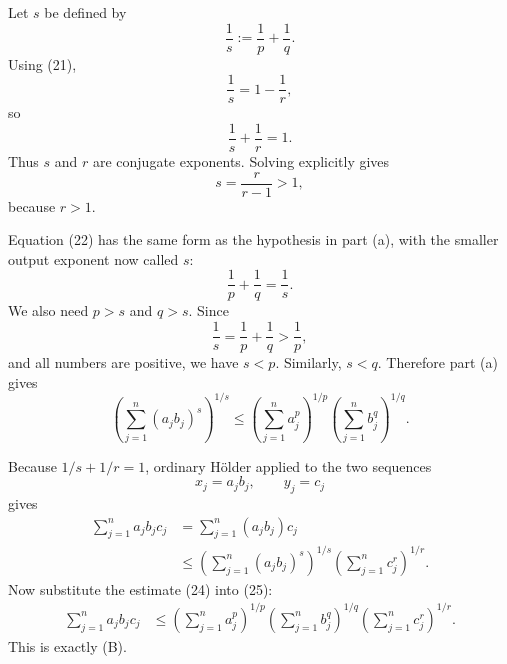 \documentclass[11pt]{article}
\newcommand{\norm}[1]{\left\lVert #1\right\rVert}
\begin{document}
\begin{solutionBox}
Let \(s\) be defined by
\[
  \frac1s:=\frac1p+\frac1q.
  \tag{22}
\]
Using (21),
\[
  \frac1s=1-\frac1r,
\]
so
\[
  \frac1s+\frac1r=1.
  \tag{23}
\]
Thus \(s\) and \(r\) are conjugate exponents. Solving explicitly gives
\[
  s=\frac{r}{r-1}>1,
\]
because \(r>1\).
\end{solutionBox}

\begin{solutionBox}
Equation (22) has the same form as the hypothesis in part (a), with the smaller output exponent now called \(s\):
\[
  \frac1p+\frac1q=\frac1s.
\]
We also need \(p>s\) and \(q>s\). Since
\[
  \frac1s=\frac1p+\frac1q>\frac1p,
\]
and all numbers are positive, we have \(s<p\). Similarly, \(s<q\). Therefore part (a) gives
\[
  \left(\sum_{j=1}^{n}(a_jb_j)^s\right)^{1/s}
  \leq
  \left(\sum_{j=1}^{n}a_j^p\right)^{1/p}
  \left(\sum_{j=1}^{n}b_j^q\right)^{1/q}.
  \tag{24}
\]
\end{solutionBox}

\begin{solutionBox}
Because \(1/s+1/r=1\), ordinary H\"older applied to the two sequences
\[
  x_j=a_jb_j,
  \qquad
  y_j=c_j
\]
gives
\[
\begin{aligned}
 \sum_{j=1}^{n}a_jb_jc_j
 &=\sum_{j=1}^{n}(a_jb_j)c_j\\
 &\leq
 \left(\sum_{j=1}^{n}(a_jb_j)^s\right)^{1/s}
 \left(\sum_{j=1}^{n}c_j^r\right)^{1/r}.
\end{aligned}
\tag{25}
\]
Now substitute the estimate (24) into (25):
\[
\begin{aligned}
 \sum_{j=1}^{n}a_jb_jc_j
 &\leq
 \left(\sum_{j=1}^{n}a_j^p\right)^{1/p}
 \left(\sum_{j=1}^{n}b_j^q\right)^{1/q}
 \left(\sum_{j=1}^{n}c_j^r\right)^{1/r}.
\end{aligned}
\]
This is exactly (B).
\end{solutionBox}

\begin{center}
\end{center}
\end{document}
